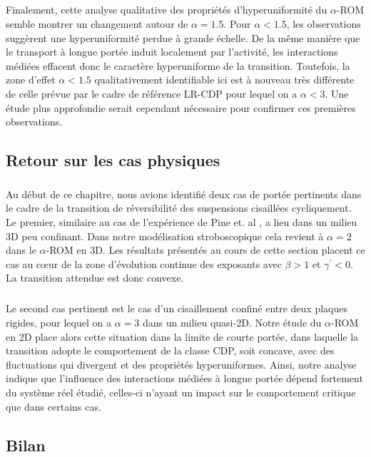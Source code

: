 \subparagraph{}Finalement, cette analyse qualitative des propriétés d'hyperuniformité du $\alpha$-ROM semble montrer un changement autour de $\alpha = 1.5$. Pour $\alpha<1.5$, les observations suggèrent une hyperuniformité perdue à grande échelle. De la même manière que le transport à longue portée induit localement par l'activité, les interactions médiées effacent donc le caractère hyperuniforme de la transition. Toutefois, la zone d'effet $\alpha < 1.5$ qualitativement identifiable ici est à nouveau très différente de celle prévue par le cadre de référence LR-CDP pour lequel on a $\alpha<3$. Une étude plus approfondie serait cependant nécessaire pour confirmer ces premières observations.

\subsection{Retour sur les cas physiques}

\subparagraph{}Au début de ce chapitre, nous avions identifié deux cas de portée pertinents dans le cadre de la transition de réversibilité des suspensions cisaillées cycliquement. Le premier, similaire au cas de l'expérience de Pine et. al \cite{pine_chaos_2005}, a lieu dans un milieu 3D peu confinant. Dans notre modélisation stroboscopique cela revient à $\alpha = 2$ dans le $\alpha$-ROM en 3D. Les résultats présentés au cours de cette section placent ce cas au cœur de la zone d'évolution continue des exposants avec $\beta > 1$ et $\gamma^\prime < 0$. La transition attendue est donc convexe.

\subparagraph{}Le second cas pertinent est le cas d'un cisaillement confiné entre deux plaques rigides, pour lequel on a $\alpha = 3$ dans un milieu quasi-2D. Notre étude du $\alpha$-ROM en 2D place alors cette situation dans la limite de courte portée, dans laquelle la transition adopte le comportement de la classe CDP, soit concave, avec des fluctuations qui divergent et des propriétés hyperuniformes. Ainsi, notre analyse indique que l'influence des interactions médiées à longue portée dépend fortement du système réel étudié, celles-ci n'ayant un impact sur le comportement critique que dans certains cas.

\subsection*{Bilan}

